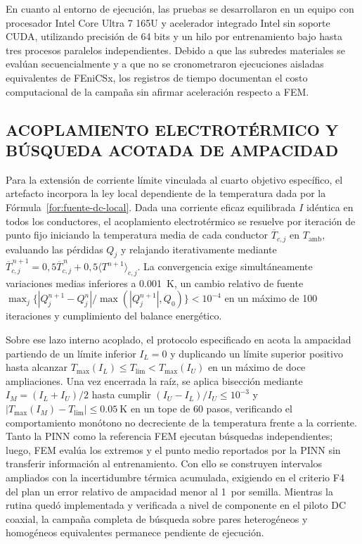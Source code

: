 En cuanto al entorno de ejecución, las pruebas se desarrollaron en un equipo con procesador Intel Core Ultra 7 165U y acelerador integrado Intel sin soporte CUDA, utilizando precisión de 64 bits y un hilo por entrenamiento bajo hasta tres procesos paralelos independientes. Debido a que las subredes materiales se evalúan secuencialmente y a que no se cronometraron ejecuciones aisladas equivalentes de FEniCSx, los registros de tiempo documentan el costo computacional de la campaña sin afirmar aceleración respecto a FEM.

\subsection{ACOPLAMIENTO ELECTROTÉRMICO Y BÚSQUEDA ACOTADA DE AMPACIDAD}
\label{subsec:busqueda-ampacidad}

Para la extensión de corriente límite vinculada al cuarto objetivo específico, el artefacto incorpora la ley local dependiente de la temperatura dada por la Fórmula~\ref{for:fuente-dc-local}. Dada una corriente eficaz equilibrada $I$ idéntica en todos los conductores, el acoplamiento electrotérmico se resuelve por iteración de punto fijo iniciando la temperatura media de cada conductor $\overline{T}_{c,j}$ en $T_{\mathrm{amb}}$, evaluando las pérdidas $Q_j$ y relajando iterativamente mediante $\overline{T}_{c,j}^{\,n+1}=0{,}5\overline{T}_{c,j}^{\,n}+0{,}5\langle T^{n+1}\rangle_{c,j}$. La convergencia exige simultáneamente variaciones medias inferiores a \SI{0,001}{\kelvin}, un cambio relativo de fuente $\max_j\{|Q_j^{n+1}-Q_j^n|/\max(|Q_j^{n+1}|,Q_0)\}<10^{-4}$ en un máximo de 100 iteraciones y cumplimiento del balance energético.

Sobre ese lazo interno acoplado, el protocolo especificado en  acota la ampacidad partiendo de un límite inferior $I_L=0$ y duplicando un límite superior positivo hasta alcanzar $T_{\max}(I_L)\leq T_{\mathrm{lim}}<T_{\max}(I_U)$ en un máximo de doce ampliaciones. Una vez encerrada la raíz, se aplica bisección mediante $I_M=(I_L+I_U)/2$ hasta cumplir $(I_U-I_L)/I_U\leq10^{-3}$ y $|T_{\max}(I_M)-T_{\mathrm{lim}}|\leq\SI{0,05}{\kelvin}$ en un tope de 60 pasos, verificando el comportamiento monótono no decreciente de la temperatura frente a la corriente. Tanto la PINN como la referencia FEM ejecutan búsquedas independientes; luego, FEM evalúa los extremos y el punto medio reportados por la PINN sin transferir información al entrenamiento. Con ello se construyen intervalos ampliados con la incertidumbre térmica acumulada, exigiendo en el criterio F4 del plan un error relativo de ampacidad menor al 1\,\pct{} por semilla. Mientras la rutina quedó implementada y verificada a nivel de componente en el piloto DC coaxial, la campaña completa de búsqueda sobre pares heterogéneos y homogéneos equivalentes permanece pendiente de ejecución.

